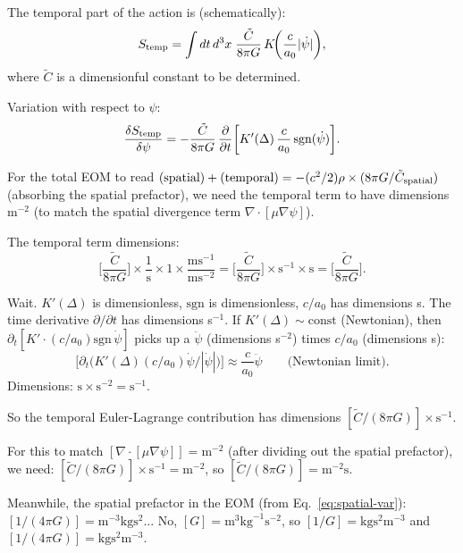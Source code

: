 \documentclass[11pt]{article}
\begin{document}
The temporal part of the action is (schematically):
\begin{equation}
S_{\rm temp} = \int dt\,d^3x\;\frac{\tilde{C}}{8\pi G}\,
K\!\biggl(\frac{c}{a_0}|\dot\psi|\biggr),
\end{equation}
where $\tilde{C}$ is a dimensionful constant to be determined.

Variation with respect to $\psi$:
\begin{equation}
\frac{\delta S_{\rm temp}}{\delta\psi}
= -\frac{\tilde{C}}{8\pi G}\,\frac{\partial}{\partial t}\biggl[
  K'(\Delta)\,\frac{c}{a_0}\,\text{sgn}(\dot\psi)
\biggr].
\end{equation}

For the total EOM to read $\text{(spatial)} + \text{(temporal)} = -(c^2/2)\rho
\times (8\pi G/\tilde{C}_{\rm spatial})$ (absorbing the spatial prefactor),
we need the temporal term to have dimensions m$^{-2}$ (to match the
spatial divergence term $\nabla\cdot[\mu\nabla\psi]$).

The temporal term dimensions:
\begin{equation}
\biggl[\frac{\tilde{C}}{8\pi G}\biggr] \times
\frac{1}{\text{s}} \times 1 \times \frac{\text{m}\text{s}^{-1}}{\text{m}\text{s}^{-2}}
= \biggl[\frac{\tilde{C}}{8\pi G}\biggr] \times \text{s}^{-1} \times \text{s}
= \biggl[\frac{\tilde{C}}{8\pi G}\biggr].
\end{equation}

Wait. $K'(\Delta)$ is dimensionless, $\text{sgn}$ is dimensionless, $c/a_0$
has dimensions s. The time derivative $\partial/\partial t$ has dimensions
s$^{-1}$. If $K'(\Delta) \sim \text{const}$ (Newtonian), then
$\partial_t[K' \cdot (c/a_0)\text{sgn}\,\dot\psi]$ picks up a $\ddot\psi$
(dimensions s$^{-2}$) times $c/a_0$ (dimensions s):
\begin{equation}
\biggl[\partial_t\bigl(K'(\Delta)(c/a_0)\dot\psi/|\dot\psi|\bigr)\biggr]
\approx \frac{c}{a_0}\ddot\psi
\qquad \text{(Newtonian limit)}.
\end{equation}
Dimensions: $\text{s} \times \text{s}^{-2} = \text{s}^{-1}$.

So the temporal Euler-Lagrange contribution has dimensions
$[\tilde{C}/(8\pi G)] \times \text{s}^{-1}$.

For this to match $[\nabla\cdot[\mu\nabla\psi]] = \text{m}^{-2}$
(after dividing out the spatial prefactor), we need:
$[\tilde{C}/(8\pi G)] \times \text{s}^{-1} = \text{m}^{-2}$, so
$[\tilde{C}/(8\pi G)] = \text{m}^{-2}\text{s}$.

Meanwhile, the spatial prefactor in the EOM (from Eq.~\eqref{eq:spatial-var}):
$[1/(4\pi G)] = \text{m}^{-3}\text{kg}\text{s}^2$... No, $[G] =
\text{m}^3\text{kg}^{-1}\text{s}^{-2}$, so $[1/G] = \text{kg}\text{s}^2\text{m}^{-3}$
and $[1/(4\pi G)] = \text{kg}\text{s}^2\text{m}^{-3}$.
\end{document}

